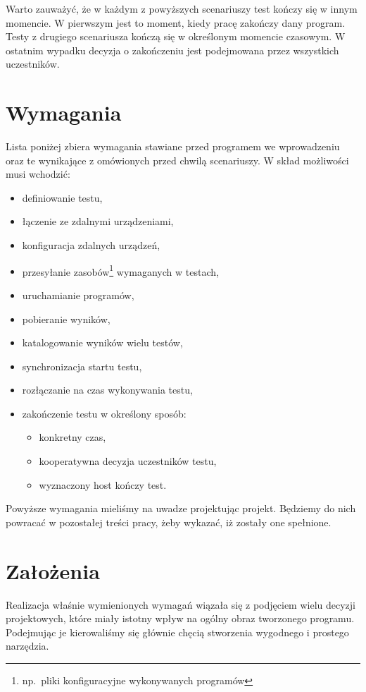 \documentclass[00-praca-magisterska.tex]{subfiles}
\begin{document}
Warto zauważyć, że w każdym z powyższych scenariuszy test kończy się w innym
momencie. W pierwszym jest to moment, kiedy pracę zakończy dany program. Testy
z drugiego scenariusza kończą się w określonym momencie czasowym. W ostatnim
wypadku decyzja o zakończeniu jest podejmowana przez wszystkich uczestników.

\section{Wymagania}

Lista poniżej zbiera wymagania stawiane przed programem we wprowadzeniu oraz te
wynikające z omówionych przed chwilą scenariuszy. W skład możliwości musi wchodzić:
\begin{itemize}
\item definiowanie testu,
\item łączenie ze zdalnymi urządzeniami,
\item konfiguracja zdalnych urządzeń,
\item przesyłanie zasobów\footnote{np.~pliki konfiguracyjne wykonywanych programów}  wymaganych w testach,
\item uruchamianie programów,
\item pobieranie wyników,
\item katalogowanie wyników wielu testów,
\item synchronizacja startu testu,
\item rozłączanie na czas wykonywania testu,
\item zakończenie testu w określony sposób:
  \begin{itemize}
  \item konkretny czas,
  \item kooperatywna decyzja uczestników testu,
  \item wyznaczony host kończy test.
  \end{itemize}
\end{itemize}

Powyższe wymagania mieliśmy na uwadze projektując projekt. Będziemy do nich
powracać w pozostałej treści pracy, żeby wykazać, iż zostały one spełnione.

\section{Założenia}

Realizacja właśnie wymienionych wymagań wiązała się z podjęciem wielu decyzji
projektowych, które miały istotny wpływ na ogólny obraz tworzonego programu.
Podejmując je kierowaliśmy się głównie chęcią stworzenia wygodnego i prostego
narzędzia.
\end{document}
